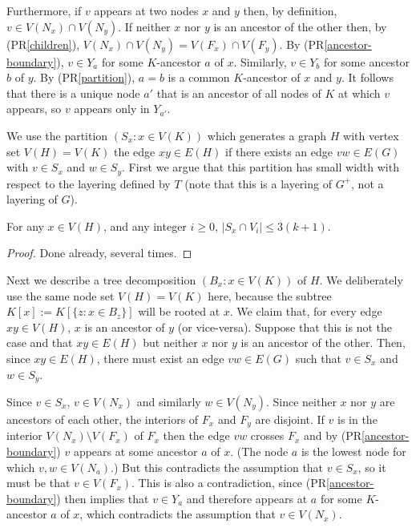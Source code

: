 \documentclass{patmorin}
\begin{document}
Furthermore, if $v$ appears at two nodes $x$ and $y$ then, by definition, $v\in V(N_x)\cap V(N_y)$. If neither $x$ nor $y$ is an ancestor of the other then, by (PR\ref{children}), $V(N_x)\cap V(N_y)=V(F_x)\cap V(F_y)$.  By (PR\ref{ancestor-boundary}), $v\in Y_a$ for some $K$-ancestor $a$ of $x$.  Similarly, $v\in Y_{b}$ for some ancestor $b$ of $y$.  By (PR\ref{partition}), $a=b$ is a common $K$-ancestor of $x$ and $y$.  It follows that there is a unique node $a'$ that is an ancestor of all nodes of $K$ at which $v$ appears, so $v$ appears only in $Y_{a'}$.



We use the partition $(S_x: x\in V(K))$ which generates a graph $H$ with vertex set $V(H)=V(K)$ the edge $xy\in E(H)$ if there exists an edge $vw\in E(G)$ with $v\in S_x$ and $w\in S_y$.
First we argue that this partition has small width with respect to the layering defined by $T$ (note that this is a layering of $G^+$, not a layering of $G$).

\begin{clm}
  For any $x\in V(H)$, and any integer $i\ge 0$, $|S_x\cap V_i|\le 3(k+1)$.
\end{clm}

\begin{proof}
  Done already, several times.
\end{proof}

Next we describe a tree decomposition $(B_x:x\in V(K))$ of $H$.  We deliberately use the same node set $V(H)=V(K)$ here, because the subtree $K[x]:=K[\{z:x\in B_z\}]$ will be rooted at $x$.  We claim that, for every edge $xy\in V(H)$, $x$ is an ancestor of $y$ (or vice-versa).  Suppose that this is not the case and that $xy\in E(H)$ but neither $x$ nor $y$ is an ancestor of the other.  Then, since $xy\in E(H)$, there must exist an edge $vw\in E(G)$ such that $v\in S_x$ and $w\in S_y$.  

Since $v\in S_x$, $v\in V(N_x)$ and similarly $w\in V(N_y)$.  Since neither $x$ nor $y$ are ancestors of each other, the interiors of $F_x$ and $F_y$ are disjoint.  If $v$ is in the interior $V(N_x)\setminus V(F_x)$ of $F_x$ then the edge $vw$ crosses $F_x$ and by (PR\ref{ancestor-boundary}) $v$ appears at some ancestor $a$ of $x$. (The node $a$ is the lowest node for which $v,w\in V(N_a)$.)  But this contradicts the assumption that $v\in S_x$, so it must be that $v\in V(F_x)$. This is also a contradiction, since (PR\ref{ancestor-boundary}) then implies that $v\in Y_a$ and therefore appears at $a$ for some $K$-ancestor $a$ of $x$, which contradicts the assumption that $v\in V(N_x)$.
\end{document}
